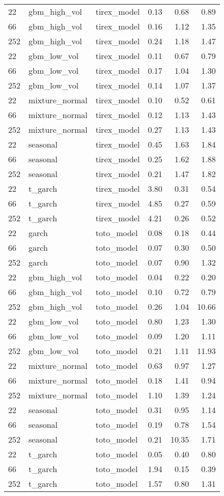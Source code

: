{\begin{tabular}{lllrrr}
\midrule
22 & gbm\_high\_vol & tirex\_model & 0.13 & 0.68 & 0.89 \\
66 & gbm\_high\_vol & tirex\_model & 0.16 & 1.12 & 1.35 \\
252 & gbm\_high\_vol & tirex\_model & 0.24 & 1.18 & 1.47 \\
\midrule
22 & gbm\_low\_vol & tirex\_model & 0.11 & 0.67 & 0.79 \\
66 & gbm\_low\_vol & tirex\_model & 0.17 & 1.04 & 1.30 \\
252 & gbm\_low\_vol & tirex\_model & 0.14 & 1.07 & 1.37 \\
\midrule
22 & mixture\_normal & tirex\_model & 0.10 & 0.52 & 0.61 \\
66 & mixture\_normal & tirex\_model & 0.12 & 1.13 & 1.43 \\
252 & mixture\_normal & tirex\_model & 0.27 & 1.13 & 1.43 \\
\midrule
22 & seasonal & tirex\_model & 0.45 & 1.63 & 1.84 \\
66 & seasonal & tirex\_model & 0.25 & 1.62 & 1.88 \\
252 & seasonal & tirex\_model & 0.21 & 1.47 & 1.82 \\
\midrule
22 & t\_garch & tirex\_model & 3.80 & 0.31 & 0.54 \\
66 & t\_garch & tirex\_model & 4.85 & 0.27 & 0.59 \\
252 & t\_garch & tirex\_model & 4.21 & 0.26 & 0.52 \\
\midrule
22 & garch & toto\_model & 0.08 & 0.18 & 0.44 \\
66 & garch & toto\_model & 0.07 & 0.30 & 0.50 \\
252 & garch & toto\_model & 0.07 & 0.90 & 1.32 \\
\midrule
22 & gbm\_high\_vol & toto\_model & 0.04 & 0.22 & 0.20 \\
66 & gbm\_high\_vol & toto\_model & 0.10 & 0.72 & 0.79 \\
252 & gbm\_high\_vol & toto\_model & 0.26 & 1.04 & 10.66 \\
\midrule
22 & gbm\_low\_vol & toto\_model & 0.80 & 1.23 & 1.30 \\
66 & gbm\_low\_vol & toto\_model & 0.09 & 1.20 & 1.11 \\
252 & gbm\_low\_vol & toto\_model & 0.21 & 1.11 & 11.93 \\
\midrule
22 & mixture\_normal & toto\_model & 0.63 & 0.97 & 1.27 \\
66 & mixture\_normal & toto\_model & 0.18 & 1.41 & 0.94 \\
252 & mixture\_normal & toto\_model & 1.10 & 1.39 & 1.24 \\
\midrule
22 & seasonal & toto\_model & 0.31 & 0.95 & 1.14 \\
66 & seasonal & toto\_model & 0.19 & 0.78 & 1.54 \\
252 & seasonal & toto\_model & 0.21 & 10.35 & 1.71 \\
\midrule
22 & t\_garch & toto\_model & 0.05 & 0.40 & 0.80 \\
66 & t\_garch & toto\_model & 1.94 & 0.15 & 0.39 \\
252 & t\_garch & toto\_model & 1.57 & 0.80 & 1.31 \\
\bottomrule
\end{tabular}
}
